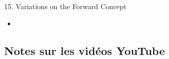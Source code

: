 \begin{CHPT_SUMM_AUTO}[label = {L.-15}]{15. Variations on the Forward Concept}
	\begin{itemize}
		\item	
	\end{itemize}
\end{CHPT_SUMM_AUTO}

\subsection{Notes sur les vidéos YouTube}

